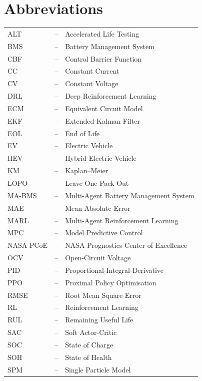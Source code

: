 \documentclass[a4paper, 12pt]{report}
\theoremstyle{definition}
\begin{document}
\section*{{\huge Abbreviations}\hfill}
\vspace{1.2cm}
\begin{tabular}{lll}
ALT  & -- & Accelerated Life Testing \\
BMS  & -- & Battery Management System \\
CBF  & -- & Control Barrier Function \\
CC   & -- & Constant Current \\
CV   & -- & Constant Voltage \\
DRL  & -- & Deep Reinforcement Learning \\
ECM  & -- & Equivalent Circuit Model \\
EKF  & -- & Extended Kalman Filter \\
EOL  & -- & End of Life \\
EV   & -- & Electric Vehicle \\
HEV  & -- & Hybrid Electric Vehicle \\
KM   & -- & Kaplan--Meier \\
LOPO & -- & Leave-One-Pack-Out \\
MA-BMS & -- & Multi-Agent Battery Management System \\
MAE  & -- & Mean Absolute Error \\
MARL & -- & Multi-Agent Reinforcement Learning \\
MPC  & -- & Model Predictive Control \\
NASA PCoE & -- & NASA Prognostics Center of Excellence \\
OCV  & -- & Open-Circuit Voltage \\
PID  & -- & Proportional-Integral-Derivative \\
PPO  & -- & Proximal Policy Optimisation \\
RMSE & -- & Root Mean Square Error \\
RL   & -- & Reinforcement Learning \\
RUL  & -- & Remaining Useful Life \\
SAC  & -- & Soft Actor-Critic \\
SOC  & -- & State of Charge \\
SOH  & -- & State of Health \\
SPM  & -- & Single Particle Model \\
\end{tabular}
\end{document}
